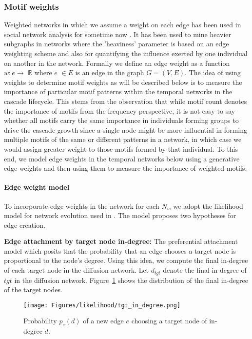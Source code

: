 \documentclass[smallextended]{svjour3}       %
\theoremstyle{definition}
\begin{document}
\subsubsection{Motif weights}
Weighted networks in which we assume a weight on each edge has been used in social network analysis for sometime now \cite{newman_wt}. It has been used to mine heavier subgraphs in networks \cite{heavy_sub} where the 'heaviness' parameter is based on an edge weighting scheme and also for quantifying the influence exerted by one individual on another in the network. Formally we define an edge weight as a function $w:e \rightarrow $ $ \mathbb{R}$ where $e$ $\in E$ is an edge in the graph $G=(V, E)$.  The idea of using weights to determine motif weights as will be described below is to measure the importance of particular motif patterns within the temporal networks in the cascade lifecycle. This stems from the observation that while motif count denotes the importance of motifs from the frequency perspective, it is not easy to say whether all motifs carry the same importance in individuals forming groups to drive the cascade growth since a single node might be more influential in forming multiple motifs of the same or different patterns in a network, in which case we would assign greater weight to those motifs formed by that individual. To this end, we model edge weights in the temporal networks below using a generative edge weights and then using them to measure the importance of weighted motifs.

\paragraph{Edge weight model}
To incorporate edge weights in the network for each $N_i$, we adopt the likelihood model for network evolution used in \cite{evol_lesk}. The model proposes two hypotheses for edge creation.

\textbf{Edge attachment by target node in-degree:} The preferential attachment model \cite{barabasi} which posits that the probability that an edge chooses a target node is proportional to the node's degree. Using this idea, we compute the final in-degree of each target node in the diffusion network. Let $d_{tgt}$ denote the final in-degree of $tgt$ in the diffusion network. Figure~\ref{fig:tgt_in_degree} shows the distribution of the final in-degree of the target nodes.

\begin{figure}[!h]
	\centering
	\texttt{[image: Figures/likelihood/tgt\_in\_degree.png]}
	\caption{Probability $p_e(d)$ of a new edge $e$ choosing a target node of in-degree $d$.}
	\label{fig:tgt_in_degree}
\end{figure}
\end{document}
